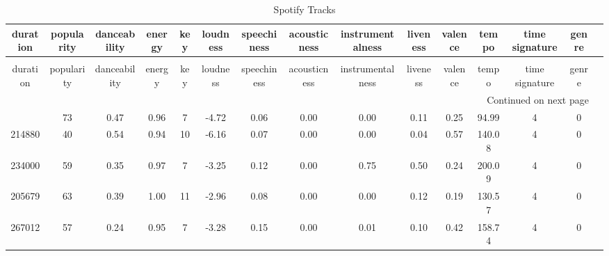 \begin{longtable}[h!]{c|c|c|c|c|c|c|c|c|c|c|c|c|c|c}
\caption{Spotify Tracks} \label{tab:tracks_dataset_datatable} \\
\toprule
duration & popularity & danceability & energy & key & loudness & speechiness & acousticness & instrumentalness & liveness & valence & tempo & time signature & genre \\
\midrule
\endfirsthead
\caption[]{Spotify Tracks} \\
\toprule
duration & popularity & danceability & energy & key & loudness & speechiness & acousticness & instrumentalness & liveness & valence & tempo & time signature & genre \\
\midrule
\endhead
\midrule
\multicolumn{14}{r}{Continued on next page} \\
\midrule
\endfoot
\bottomrule
\endlastfoot
245240 & 73 & 0.47 & 0.96 & 7 & -4.72 & 0.06 & 0.00 & 0.00 & 0.11 & 0.25 & 94.99 & 4 & 0 \\
214880 & 40 & 0.54 & 0.94 & 10 & -6.16 & 0.07 & 0.00 & 0.00 & 0.04 & 0.57 & 140.08 & 4 & 0 \\
234000 & 59 & 0.35 & 0.97 & 7 & -3.25 & 0.12 & 0.00 & 0.75 & 0.50 & 0.24 & 200.09 & 4 & 0 \\
205679 & 63 & 0.39 & 1.00 & 11 & -2.96 & 0.08 & 0.00 & 0.00 & 0.12 & 0.19 & 130.57 & 4 & 0 \\
267012 & 57 & 0.24 & 0.95 & 7 & -3.28 & 0.15 & 0.00 & 0.01 & 0.10 & 0.42 & 158.74 & 4 & 0 \\
\end{longtable}
